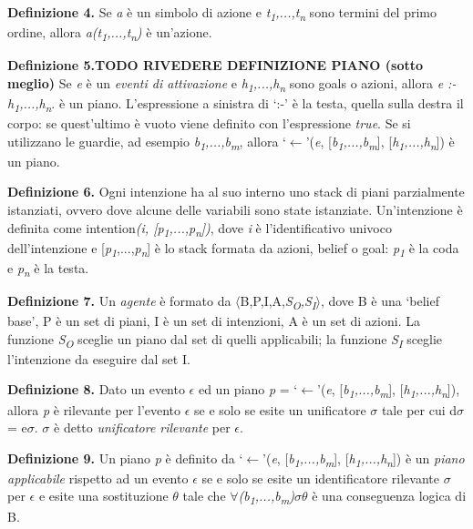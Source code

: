 \smallskip
\textbf{Definizione 4.} Se \textit{a} \`e un simbolo di azione e \textit{t\textsubscript{1},...,t\textsubscript{n}} sono termini del primo ordine, allora \textit{a(t\textsubscript{1},...,t\textsubscript{n})} \`e un'azione.

\smallskip
\textbf{Definizione 5.\textbf{TODO RIVEDERE DEFINIZIONE PIANO (sotto meglio)}} Se \textit{e} \`e un \textit{eventi di attivazione} e \textit{h\textsubscript{1},...,h\textsubscript{n}} sono goals o azioni, allora \textit{e :- h\textsubscript{1},...,h\textsubscript{n}}. \`e un piano. L'espressione a sinistra di `:-' \`e la testa, quella sulla destra il corpo: se quest'ultimo \`e vuoto viene definito con l'espressione \textit{true}.
Se si utilizzano le guardie, ad esempio \textit{b\textsubscript{1},...,b\textsubscript{m}}, allora `$\leftarrow$'(\textit{e}, [\textit{b\textsubscript{1},...,b\textsubscript{m}}], [\textit{h\textsubscript{1},...,h\textsubscript{n}}]) \`e un piano.

\smallskip
\textbf{Definizione 6.} Ogni intenzione ha al suo interno uno stack di piani parzialmente istanziati, ovvero dove alcune delle variabili sono state istanziate. Un'intenzione \`e definita come intention\textit{(i, [\textit{p\textsubscript{1}},...,\textit{p\textsubscript{n}}])}, dove \textit{i} \`e l'identificativo univoco dell'intenzione e [\textit{p\textsubscript{1}},...,\textit{p\textsubscript{n}}] \`e lo stack formata da azioni, belief o goal: \textit{p\textsubscript{1}} \`e la coda e \textit{p\textsubscript{n}} \`e la testa.

\smallskip
\textbf{Definizione 7.} Un \textit{agente} \`e formato da $\langle$B,P,I,A,\textit{S\textsubscript{O},S\textsubscript{I}}$\rangle$, dove B \`e una `belief base', P \`e un set di piani, I \`e un set di intenzioni, A \`e un set di azioni. La funzione \textit{S\textsubscript{O}} sceglie un piano dal set di quelli applicabili; la funzione \textit{S\textsubscript{I}} sceglie l'intenzione da eseguire dal set I.

\smallskip
\textbf{Definizione 8.} Dato un evento \textit{$\epsilon$} ed un piano \textit{p} = `$\leftarrow$'(\textit{e}, [\textit{b\textsubscript{1},...,b\textsubscript{m}}], [\textit{h\textsubscript{1},...,h\textsubscript{n}}]), allora \textit{p} \`e rilevante per l'evento \textit{$\epsilon$} se e solo se esite un unificatore $\sigma$ tale per cui d$\sigma$ = e$\sigma$. \textit{$\sigma$} \`e detto \textit{unificatore rilevante} per \textit{$\epsilon$}.

\smallskip
\textbf{Definizione 9.} Un piano \textit{p} \`e definito da `$\leftarrow$'(\textit{e}, [\textit{b\textsubscript{1},...,b\textsubscript{m}}], [\textit{h\textsubscript{1},...,h\textsubscript{n}}]) \`e un \textit{piano applicabile} rispetto ad un evento \textit{$\epsilon$} se e solo se esite un identificatore rilevante $\sigma$ per \textit{$\epsilon$} e esite una sostituzione \textit{$\theta$} tale che $\forall$\textit{(b\textsubscript{1},...,b\textsubscript{m})}\textit{$\sigma\theta$} \`e una conseguenza logica di B.


